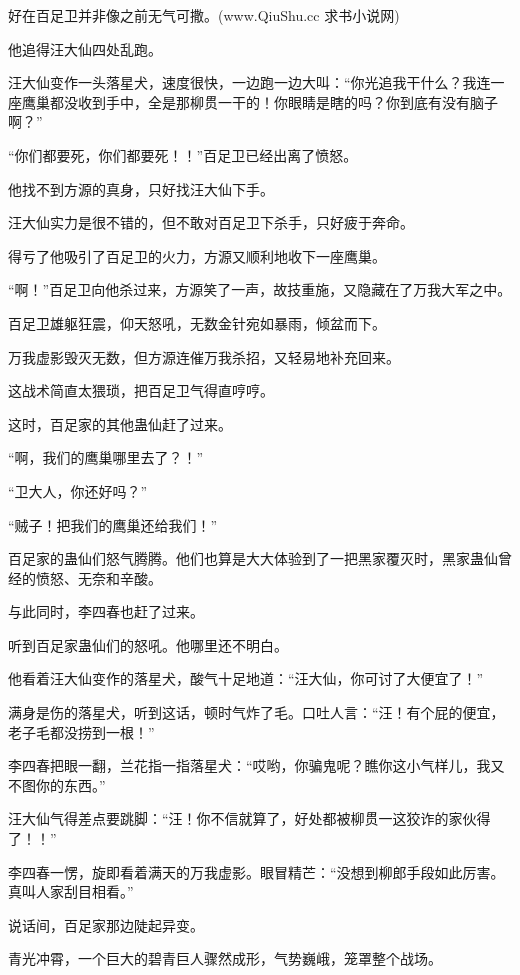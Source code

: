 
\begin{this_body}

好在百足卫并非像之前无气可撒。(www.QiuShu.cc 求书小说网)

他追得汪大仙四处乱跑。

汪大仙变作一头落星犬，速度很快，一边跑一边大叫：“你光追我干什么？我连一座鹰巢都没收到手中，全是那柳贯一干的！你眼睛是瞎的吗？你到底有没有脑子啊？”

“你们都要死，你们都要死！！”百足卫已经出离了愤怒。

他找不到方源的真身，只好找汪大仙下手。

汪大仙实力是很不错的，但不敢对百足卫下杀手，只好疲于奔命。

得亏了他吸引了百足卫的火力，方源又顺利地收下一座鹰巢。

“啊！”百足卫向他杀过来，方源笑了一声，故技重施，又隐藏在了万我大军之中。

百足卫雄躯狂震，仰天怒吼，无数金针宛如暴雨，倾盆而下。

万我虚影毁灭无数，但方源连催万我杀招，又轻易地补充回来。

这战术简直太猥琐，把百足卫气得直哼哼。

这时，百足家的其他蛊仙赶了过来。

“啊，我们的鹰巢哪里去了？！”

“卫大人，你还好吗？”

“贼子！把我们的鹰巢还给我们！”

百足家的蛊仙们怒气腾腾。他们也算是大大体验到了一把黑家覆灭时，黑家蛊仙曾经的愤怒、无奈和辛酸。

与此同时，李四春也赶了过来。

听到百足家蛊仙们的怒吼。他哪里还不明白。

他看着汪大仙变作的落星犬，酸气十足地道：“汪大仙，你可讨了大便宜了！”

满身是伤的落星犬，听到这话，顿时气炸了毛。口吐人言：“汪！有个屁的便宜，老子毛都没捞到一根！”

李四春把眼一翻，兰花指一指落星犬：“哎哟，你骗鬼呢？瞧你这小气样儿，我又不图你的东西。”

汪大仙气得差点要跳脚：“汪！你不信就算了，好处都被柳贯一这狡诈的家伙得了！！”

李四春一愣，旋即看着满天的万我虚影。眼冒精芒：“没想到柳郎手段如此厉害。真叫人家刮目相看。”

说话间，百足家那边陡起异变。

青光冲霄，一个巨大的碧青巨人骤然成形，气势巍峨，笼罩整个战场。


\end{this_body}
